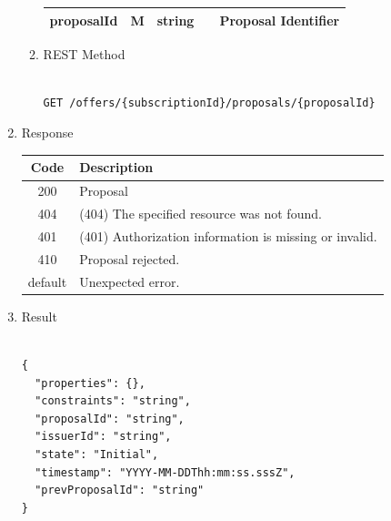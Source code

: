 \begin{enumerate}
\begin{enumerate}
\begin{table}[H]
\begin{center}
\begin{tabular}{|p{3cm}|l|p{3cm}|p{3cm}|p{4cm}|}
proposalId		& M & 	string			&		&	Proposal Identifier \\

\hline	

\end{tabular}
\end{center}

\end{table}

\item REST Method

\begin{tcolorbox}[boxrule=0pt, frame empty]
\begin{verbatim} 

GET /offers/{subscriptionId}/proposals/{proposalId}

\end{verbatim}
\end{tcolorbox}

\end{enumerate}

\item Response

\begin{table}[H]
\footnotesize

\begin{center}
\begin{tabular}{|c|l|} 
\hline
\rowcolor{lightgray}	Code 		& 	Description \\
\hline
200	 		&	Proposal  \\
\hline
404			&	(404) The specified resource was not found. \\
\hline
401			&	(401) Authorization information is missing or invalid. \\
\hline
410			&	Proposal rejected. \\
\hline
default		&	Unexpected error. \\
\hline
\end{tabular}
\end{center}

\end{table}

\item Result

\begin{tcolorbox}[boxrule=0pt, frame empty]
\begin{verbatim}

{
  "properties": {},
  "constraints": "string",
  "proposalId": "string",
  "issuerId": "string",
  "state": "Initial",
  "timestamp": "YYYY-MM-DDThh:mm:ss.sssZ",
  "prevProposalId": "string"
}


\end{verbatim}
\end{tcolorbox}
\end{enumerate}
